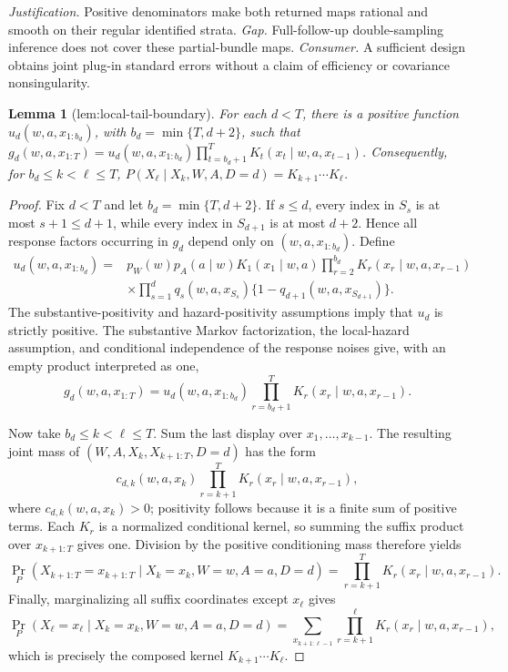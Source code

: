 \documentclass{article}
\newtheorem{lemma}{Lemma}
\begin{document}
\par\smallskip\noindent \textit{Justification.} Positive denominators make both returned maps rational and smooth on their regular identified strata. \textit{Gap.} Full-follow-up double-sampling inference does not cover these partial-bundle maps. \textit{Consumer.} A sufficient design obtains joint plug-in standard errors without a claim of efficiency or covariance nonsingularity.

\begin{lemma}[lem:local-tail-boundary]\label{lem:local-tail-boundary}
For each \(d<T\), there is a positive function \(u_d(w,a,x_{1:b_d})\), with \(b_d=\min\{T,d+2\}\), such that \(g_d(w,a,x_{1:T})=u_d(w,a,x_{1:b_d})\prod_{t=b_d+1}^T K_t(x_t\mid w,a,x_{t-1})\). Consequently, for \(b_d\le k<\ell\le T\), \(P(X_\ell\mid X_k,W,A,D=d)=K_{k+1}\cdots K_\ell\).
\end{lemma}
\begin{proof}
Fix \(d<T\) and let \(b_d=\min\{T,d+2\}\).  If \(s\le d\), every index
in \(S_s\) is at most \(s+1\le d+1\), while every index in
\(S_{d+1}\) is at most \(d+2\).  Hence all response factors occurring
in \(g_d\) depend only on \((w,a,x_{1:b_d})\).  Define
\[
\begin{aligned}
u_d(w,a,x_{1:b_d})
={}&p_W(w)p_A(a\mid w)K_1(x_1\mid w,a)
       \prod_{r=2}^{b_d}K_r(x_r\mid w,a,x_{r-1})\\
&\times\prod_{s=1}^{d}q_s(w,a,x_{S_s})
       \{1-q_{d+1}(w,a,x_{S_{d+1}})\}.
\end{aligned}
\]
The substantive-positivity and hazard-positivity assumptions imply that
\(u_d\) is strictly positive.  The substantive Markov factorization, the
local-hazard assumption, and conditional independence of the response
noises give, with an empty product interpreted as one,
\[
g_d(w,a,x_{1:T})
=u_d(w,a,x_{1:b_d})
  \prod_{r=b_d+1}^{T}K_r(x_r\mid w,a,x_{r-1}).
\]

Now take \(b_d\le k<\ell\le T\).  Sum the last display over
\(x_1,\ldots,x_{k-1}\).  The resulting joint mass of
\((W,A,X_k,X_{k+1:T},D=d)\) has the form
\[
c_{d,k}(w,a,x_k)
\prod_{r=k+1}^{T}K_r(x_r\mid w,a,x_{r-1}),
\]
where \(c_{d,k}(w,a,x_k)>0\); positivity follows because it is a finite
sum of positive terms.  Each \(K_r\) is a normalized conditional kernel,
so summing the suffix product over \(x_{k+1:T}\) gives one.  Division by
the positive conditioning mass therefore yields
\[
\Pr_P(X_{k+1:T}=x_{k+1:T}\mid
      X_k=x_k,W=w,A=a,D=d)
=\prod_{r=k+1}^{T}K_r(x_r\mid w,a,x_{r-1}).
\]
Finally, marginalizing all suffix coordinates except \(x_\ell\) gives
\[
\Pr_P(X_\ell=x_\ell\mid X_k=x_k,W=w,A=a,D=d)
=\sum_{x_{k+1:\ell-1}}
  \prod_{r=k+1}^{\ell}K_r(x_r\mid w,a,x_{r-1}),
\]
which is precisely the composed kernel \(K_{k+1}\cdots K_\ell\).
\end{proof}
\end{document}

